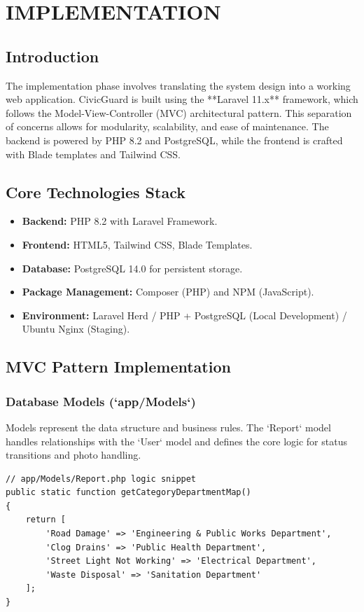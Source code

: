\chapter{IMPLEMENTATION}

\section{Introduction}
The implementation phase involves translating the system design into a working web application. CivicGuard is built using the **Laravel 11.x** framework, which follows the Model-View-Controller (MVC) architectural pattern. This separation of concerns allows for modularity, scalability, and ease of maintenance. The backend is powered by PHP 8.2 and PostgreSQL, while the frontend is crafted with Blade templates and Tailwind CSS.

\section{Core Technologies Stack}
\begin{itemize}
    \item \textbf{Backend:} PHP 8.2 with Laravel Framework.
    \item \textbf{Frontend:} HTML5, Tailwind CSS, Blade Templates.
    \item \textbf{Database:} PostgreSQL 14.0 for persistent storage.
    \item \textbf{Package Management:} Composer (PHP) and NPM (JavaScript).
    \item \textbf{Environment:} Laravel Herd / PHP + PostgreSQL (Local Development) / Ubuntu Nginx (Staging).
\end{itemize}

\section{MVC Pattern Implementation}

\subsection{Database Models (`app/Models`)}
Models represent the data structure and business rules. The `Report` model handles relationships with the `User` model and defines the core logic for status transitions and photo handling.
\begin{lstlisting}[style=phpstyle]
// app/Models/Report.php logic snippet
public static function getCategoryDepartmentMap()
{
    return [
        'Road Damage' => 'Engineering & Public Works Department',
        'Clog Drains' => 'Public Health Department',
        'Street Light Not Working' => 'Electrical Department',
        'Waste Disposal' => 'Sanitation Department'
    ];
}
\end{lstlisting}

